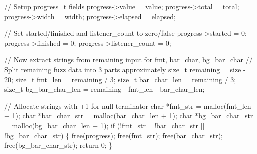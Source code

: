 \documentclass[
  a4paper,
]{scrreprt}
\newenvironment{Shaded}{\begin{snugshade}}{\end{snugshade}}
\newcommand{\CommentTok}[1]{\textcolor[rgb]{0.41,0.41,0.41}{#1}}
\newcommand{\ControlFlowTok}[1]{\textcolor[rgb]{0.85,0.12,0.09}{#1}}
\newcommand{\DataTypeTok}[1]{\textcolor[rgb]{0.47,0.16,0.63}{#1}}
\newcommand{\DecValTok}[1]{\textcolor[rgb]{0.47,0.16,0.63}{#1}}
\newcommand{\NormalTok}[1]{\textcolor[rgb]{0.33,0.33,0.33}{#1}}
\newcommand{\OperatorTok}[1]{\textcolor[rgb]{0.00,0.46,0.62}{#1}}
\theoremstyle{definition}
\theoremstyle{remark}
\begin{document}
\begin{Shaded}
\begin{Highlighting}[numbers=left,,]
    \CommentTok{// Setup progress\_t fields}
\NormalTok{    progress}\OperatorTok{{-}\textgreater{}}\NormalTok{value }\OperatorTok{=}\NormalTok{ value}\OperatorTok{;}
\NormalTok{    progress}\OperatorTok{{-}\textgreater{}}\NormalTok{total }\OperatorTok{=}\NormalTok{ total}\OperatorTok{;}
\NormalTok{    progress}\OperatorTok{{-}\textgreater{}}\NormalTok{width }\OperatorTok{=}\NormalTok{ width}\OperatorTok{;}
\NormalTok{    progress}\OperatorTok{{-}\textgreater{}}\NormalTok{elapsed }\OperatorTok{=}\NormalTok{ elapsed}\OperatorTok{;}

    \CommentTok{// Set started/finished and listener\_count to zero/false}
\NormalTok{    progress}\OperatorTok{{-}\textgreater{}}\NormalTok{started }\OperatorTok{=} \DecValTok{0}\OperatorTok{;}
\NormalTok{    progress}\OperatorTok{{-}\textgreater{}}\NormalTok{finished }\OperatorTok{=} \DecValTok{0}\OperatorTok{;}
\NormalTok{    progress}\OperatorTok{{-}\textgreater{}}\NormalTok{listener\_count }\OperatorTok{=} \DecValTok{0}\OperatorTok{;}

    \CommentTok{// Now extract strings from remaining input for fmt, bar\_char, bg\_bar\_char}
    \CommentTok{// Split remaining fuzz data into 3 parts approximately}
    \DataTypeTok{size\_t}\NormalTok{ remaining }\OperatorTok{=}\NormalTok{ size }\OperatorTok{{-}} \DecValTok{20}\OperatorTok{;}
    \DataTypeTok{size\_t}\NormalTok{ fmt\_len }\OperatorTok{=}\NormalTok{ remaining }\OperatorTok{/} \DecValTok{3}\OperatorTok{;}
    \DataTypeTok{size\_t}\NormalTok{ bar\_char\_len }\OperatorTok{=}\NormalTok{ remaining }\OperatorTok{/} \DecValTok{3}\OperatorTok{;}
    \DataTypeTok{size\_t}\NormalTok{ bg\_bar\_char\_len }\OperatorTok{=}\NormalTok{ remaining }\OperatorTok{{-}}\NormalTok{ fmt\_len }\OperatorTok{{-}}\NormalTok{ bar\_char\_len}\OperatorTok{;}

    \CommentTok{// Allocate strings with +1 for null terminator}
    \DataTypeTok{char} \OperatorTok{*}\NormalTok{fmt\_str }\OperatorTok{=}\NormalTok{ malloc}\OperatorTok{(}\NormalTok{fmt\_len }\OperatorTok{+} \DecValTok{1}\OperatorTok{);}
    \DataTypeTok{char} \OperatorTok{*}\NormalTok{bar\_char\_str }\OperatorTok{=}\NormalTok{ malloc}\OperatorTok{(}\NormalTok{bar\_char\_len }\OperatorTok{+} \DecValTok{1}\OperatorTok{);}
    \DataTypeTok{char} \OperatorTok{*}\NormalTok{bg\_bar\_char\_str }\OperatorTok{=}\NormalTok{ malloc}\OperatorTok{(}\NormalTok{bg\_bar\_char\_len }\OperatorTok{+} \DecValTok{1}\OperatorTok{);}
    \ControlFlowTok{if} \OperatorTok{(!}\NormalTok{fmt\_str }\OperatorTok{||} \OperatorTok{!}\NormalTok{bar\_char\_str }\OperatorTok{||} \OperatorTok{!}\NormalTok{bg\_bar\_char\_str}\OperatorTok{)} \OperatorTok{\{}
\NormalTok{        free}\OperatorTok{(}\NormalTok{progress}\OperatorTok{);}
\NormalTok{        free}\OperatorTok{(}\NormalTok{fmt\_str}\OperatorTok{);}
\NormalTok{        free}\OperatorTok{(}\NormalTok{bar\_char\_str}\OperatorTok{);}
\NormalTok{        free}\OperatorTok{(}\NormalTok{bg\_bar\_char\_str}\OperatorTok{);}
        \ControlFlowTok{return} \DecValTok{0}\OperatorTok{;}
    \OperatorTok{\}}


\end{Highlighting}
\end{Shaded}
\end{document}
